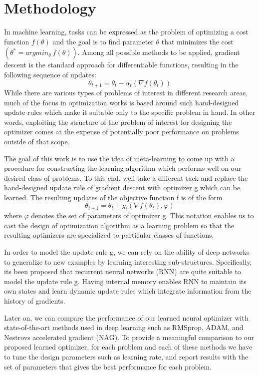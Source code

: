 \documentclass[a4paper, 11pt]{article}
\begin{document}
\vspace{1.5cm}
\section{Methodology}

In machine learning, tasks can be expressed as the problem of optimizing a cost function $f(\theta)$ and the goal is to find parameter $\theta$ that minimizes the cost $(\theta^*=argmin_{\theta} \ f(\theta))$. Among all possible methods to be applied, gradient descent is the standard approach for differentiable functions, resulting in the following sequence of updates:
$$\theta_{t+1}=\theta_{t}-\alpha_t(\nabla f(\theta_{t}))$$
While there are various types of problems of interest in different research areas, much of the focus in optimization works is based around such hand-designed update rules which make it suitable only to the specific problem in hand. In other words, exploiting the structure of the problem of interest for designing the optimizer comes at the expense of potentially poor performance on problems outside of that scope. 

The goal of this work is to use the idea of meta-learning to come up with a procedure for constructing the learning algorithm which performs well on our desired class of problems. To this end, we\textsc{}ll take a different tack and replace the hand-designed update rule of gradient descent with optimizer g which can be learned. The resulting updates of the objective function f is of the form
$$\theta_{t+1}=\theta_{t}+g_t(\nabla f(\theta_{t}),\varphi)$$
where $\varphi$ denotes the set of parameters of optimizer g. This notation enables us to cast the design of optimization algorithm as a learning problem so that the resulting optimizers are specialized to particular classes of functions. 

In order to model the update rule g, we can rely on the ability of deep networks to generalize to new examples by learning interesting sub-structures. Specifically, it\textsc{}s been proposed that recurrent neural networks (RNN) are quite suitable to model the update rule g. Having internal memory enables RNN to maintain its own states and learn dynamic update rules which integrate information from the history of gradients. 

Later on, we can compare the performance of our learned neural optimizer with state-of-the-art methods used in deep learning such as RMSprop, ADAM, and Nestrov\textsc{}s accelerated gradient (NAG). To provide a meaningful comparison to our proposed learned optimizer, for each problem and each of these methods we have to tune the design parameters such as learning rate, and report results with the set of parameters that gives the best performance for each problem. 
\end{document}
